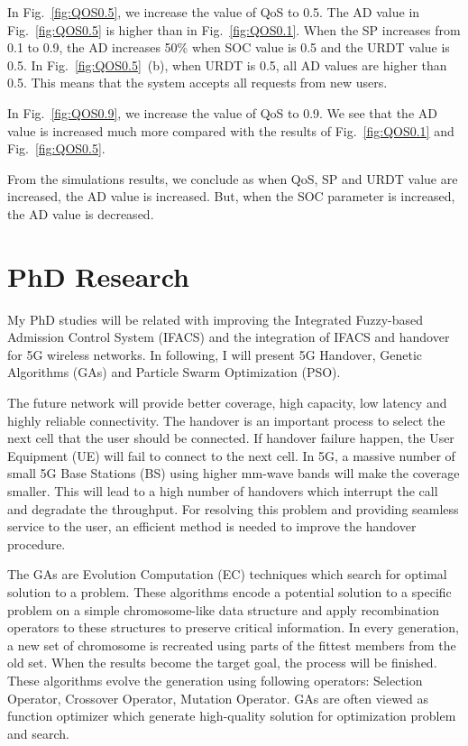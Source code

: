 \documentclass[graybox]{svmult}
\begin{document}
In Fig.~\ref{fig:QOS0.5}, we increase the value of QoS to 0.5. The AD value in Fig.~\ref{fig:QOS0.5} is higher than in Fig.~\ref{fig:QOS0.1}. When the SP increases from 0.1 to 0.9, the AD increases 50\% when SOC value is 0.5 and the URDT value is 0.5. In Fig.~\ref{fig:QOS0.5}~(b), when URDT is 0.5, all AD values are higher than 0.5. This means that the system accepts all requests from new users.

In Fig.~\ref{fig:QOS0.9}, we increase the value of QoS to 0.9. We see that the AD value is increased much more compared with the results of Fig.~\ref{fig:QOS0.1} and Fig.~\ref{fig:QOS0.5}. 


From the simulations results, we conclude as when QoS, SP and URDT value are increased, the AD value is increased. But, when the SOC parameter is increased, the AD value is decreased.


\section{PhD Research}

My PhD studies will be related with improving the Integrated Fuzzy-based Admission Control System  (IFACS) and the integration of IFACS and handover for 5G wireless networks. In following, I will present 5G Handover, Genetic Algorithms (GAs) and Particle Swarm Optimization (PSO).

The future network will provide better coverage, high capacity, low latency and highly reliable connectivity. The handover is an important process to select the next cell that the user should be connected. If handover failure happen, the User Equipment (UE) will fail to connect to the next cell. In 5G, a  massive number of small 5G Base Stations (BS)  using higher mm-wave bands will make the coverage smaller. This will lead to a high number of handovers which interrupt the call and degradate the throughput. For resolving this problem and providing seamless service to the user, an efficient method is needed to improve the handover procedure. 


The GAs are Evolution Computation (EC) techniques which search for optimal solution to a problem. These algorithms encode a potential solution to a specific problem on a simple chromosome-like data structure and apply recombination operators to these structures to preserve critical information. In every generation, a new set of chromosome is recreated  using parts of the fittest members from the old set. When the results become the target goal, the process will be finished. These algorithms evolve the generation using following operators: Selection Operator, Crossover Operator, Mutation Operator. GAs are often viewed as function optimizer which generate high-quality solution for optimization problem and search. 
\end{document}
